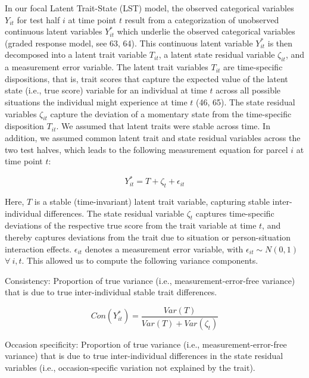 \documentclass[
  man,floatsintext]{apa6}
\begin{document}
In our focal Latent Trait-State (LST) model, the observed categorical variables \(Y_{it}\) for test half \(i\) at time point \(t\) result from a categorization of unobserved continuous latent variables \(Y^*_{it}\) which underlie the observed categorical variables (graded response model, see 63, 64). This continuous latent variable \(Y^*_{it}\) is then decomposed into a latent trait variable \(T_{it}\), a latent state residual variable \(\zeta_{it}\), and a measurement error variable. The latent trait variables \(T_{it}\) are time-specific dispositions, that is, trait scores that capture the expected value of the latent state (i.e., true score) variable for an individual at time \(t\) across all possible situations the individual might experience at time \(t\) (46, 65). The state residual variables \(\zeta_{it}\) capture the deviation of a momentary state from the time-specific disposition \(T_{it}\). We assumed that latent traits were stable across time. In addition, we assumed common latent trait and state residual variables across the two test halves, which leads to the following measurement equation for parcel \(i\) at time point \(t\):

\begin{equation}
Y^*_{it}= T + \zeta_t + \epsilon_{it}
\end{equation}

Here, \(T\) is a stable (time-invariant) latent trait variable, capturing stable inter-individual differences. The state residual variable \(\zeta_t\) captures time-specific deviations of the respective true score from the trait variable at time \(t\), and thereby captures deviations from the trait due to situation or person-situation interaction effects. \(\epsilon_{it}\) denotes a measurement error variable, with \(\epsilon_{it} \sim N(0,1)\) \(\forall~ i,t\). This allowed us to compute the following variance components.

Consistency: Proportion of true variance (i.e., measurement-error-free variance) that is due to true inter-individual stable trait differences.

\begin{equation}
Con(Y^*_{it})=\frac{Var(T)}{Var(T)+Var(\zeta_t)}
\end{equation}

Occasion specificity: Proportion of true variance (i.e., measurement-error-free variance) that is due to true inter-individual differences in the state residual variables (i.e., occasion-specific variation not explained by the trait).
\end{document}
